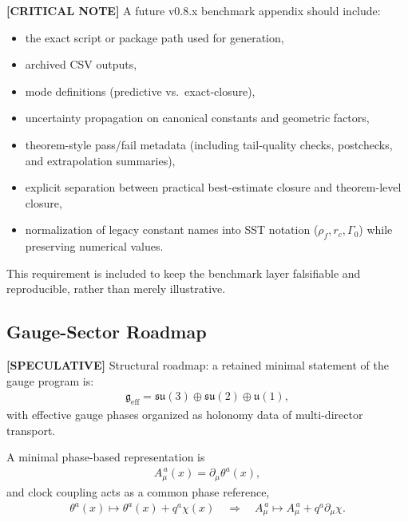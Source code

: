 \documentclass[11pt]{article}
\theoremstyle{definition}
\theoremstyle{plain}
\theoremstyle{remark}
\newcommand{\rhoF}{{\rho_{\!f}}}
\newcommand{\rc}{{r_c}}
\begin{document}
        \textbf{[CRITICAL NOTE]} A future v0.8.x benchmark appendix should include:
        \begin{itemize}
            \item the exact script or package path used for generation,
            \item archived CSV outputs,
            \item mode definitions (predictive vs.\ exact-closure),
            \item uncertainty propagation on canonical constants and geometric factors,
            \item theorem-style pass/fail metadata (including tail-quality checks, postchecks, and extrapolation summaries),
            \item explicit separation between practical best-estimate closure and theorem-level closure,
            \item normalization of legacy constant names into SST notation (\(\rhoF,\rc,\Gamma_0\)) while preserving numerical values.
        \end{itemize}

        This requirement is included to keep the benchmark layer falsifiable and reproducible, rather than merely illustrative.

    \subsection{Gauge-Sector Roadmap}
        \label{subsec:integration_gauge}

        \textbf{[SPECULATIVE]} Structural roadmap: a retained minimal statement of the gauge program is:
        \begin{align}
            \mathfrak{g}_{\mathrm{eff}}
            =
            \mathfrak{su}(3)\oplus\mathfrak{su}(2)\oplus\mathfrak{u}(1),
        \end{align}
        with effective gauge phases organized as holonomy data of multi-director transport.

        A minimal phase-based representation is
        \begin{align}
            A_\mu^{\,a}(x) = \partial_\mu \theta^a(x),
            \label{eq:gauge_phase_potential}
        \end{align}
        and clock coupling acts as a common phase reference,
        \begin{align}
            \theta^a(x) \mapsto \theta^a(x) + q^a \chi(x)
            \quad\Rightarrow\quad
            A_\mu^{\,a} \mapsto A_\mu^{\,a} + q^a \partial_\mu \chi.
            \label{eq:gauge_clock_shift}
        \end{align}
\end{document}
